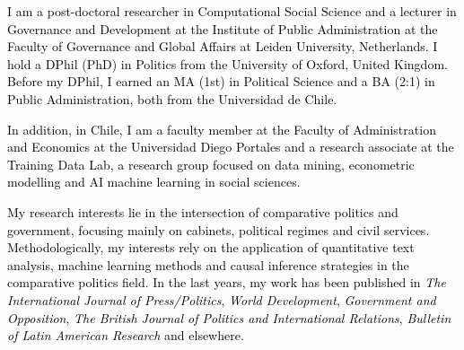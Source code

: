 




\vspace{3mm}

\begin{cvparagraph}

\textcolor{black}{I am a post-doctoral researcher in Computational Social Science and a lecturer in Governance and Development at the Institute of Public Administration at the Faculty of Governance and Global Affairs at Leiden University, Netherlands. I hold a DPhil (PhD) in Politics from the University of Oxford, United Kingdom. Before my DPhil, I earned an MA (1st) in Political Science and a BA (2:1) in Public Administration, both from the Universidad de Chile.}

\textcolor{black}{In addition, in Chile, I am a faculty member at the Faculty of Administration and Economics at the Universidad Diego Portales and a research associate at the Training Data Lab, a research group focused on data mining, econometric modelling and AI machine learning in social sciences.}

\textcolor{black}{My research interests lie in the intersection of comparative politics and government, focusing mainly on cabinets, political regimes and civil services. Methodologically, my interests rely on the application of quantitative text analysis, machine learning methods and causal inference strategies in the comparative politics field. In the last years, my work has been published in {\itshape The International Journal of Press/Politics}, {\itshape World Development}, {\itshape Government and Opposition}, {\itshape The British Journal of Politics and International Relations}, {\itshape Bulletin of Latin American Research} and elsewhere.}
\vspace{1mm}
\end{cvparagraph}
